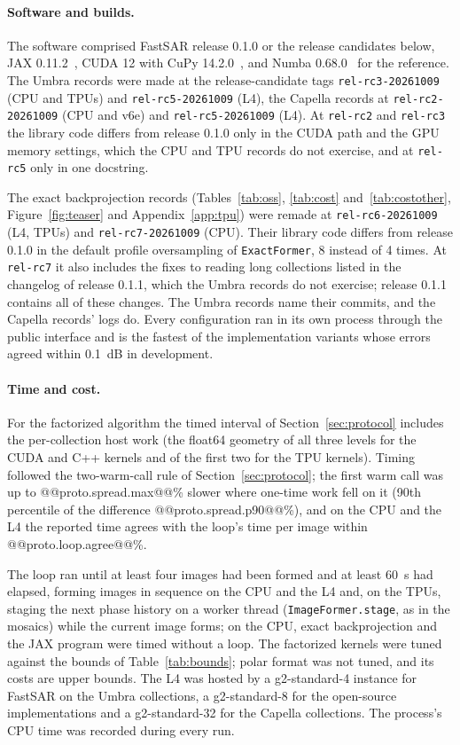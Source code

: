 \documentclass[11pt]{article}
\begin{document}
\paragraph{Software and builds.} The software comprised FastSAR release 0.1.0 or the release candidates below, JAX 0.11.2~\cite{jax2018}, CUDA 12 with CuPy 14.2.0~\cite{okuta2017}, and Numba 0.68.0~\cite{lam2015} for the reference. The Umbra records were made at the release-candidate tags \texttt{rel-rc3-20261009} (CPU and TPUs) and \texttt{rel-rc5-20261009} (L4), the Capella records at \texttt{rel-rc2-20261009} (CPU and v6e) and \texttt{rel-rc5-20261009} (L4). At \texttt{rel-rc2} and \texttt{rel-rc3} the library code differs from release 0.1.0 only in the CUDA path and the GPU memory settings, which the CPU and TPU records do not exercise, and at \texttt{rel-rc5} only in one docstring.

The exact backprojection records (Tables~\ref{tab:oss}, \ref{tab:cost} and~\ref{tab:costother}, Figure~\ref{fig:teaser} and Appendix~\ref{app:tpu}) were remade at \texttt{rel-rc6-20261009} (L4, TPUs) and \texttt{rel-rc7-20261009} (CPU). Their library code differs from release 0.1.0 in the default profile oversampling of \texttt{ExactFormer}, 8 instead of 4 times. At \texttt{rel-rc7} it also includes the fixes to reading long collections listed in the changelog of release 0.1.1, which the Umbra records do not exercise; release 0.1.1 contains all of these changes. The Umbra records name their commits, and the Capella records' logs do. Every configuration ran in its own process through the public interface and is the fastest of the implementation variants whose errors agreed within 0.1~dB in development.

\paragraph{Time and cost.} For the factorized algorithm the timed interval of Section~\ref{sec:protocol} includes the per-collection host work (the float64 geometry of all three levels for the CUDA and C++ kernels and of the first two for the TPU kernels). Timing followed the two-warm-call rule of Section~\ref{sec:protocol}; the first warm call was up to @@proto.spread.max@@\% slower where one-time work fell on it (90th percentile of the difference @@proto.spread.p90@@\%), and on the CPU and the L4 the reported time agrees with the loop's time per image within @@proto.loop.agree@@\%.

The loop ran until at least four images had been formed and at least 60~s had elapsed, forming images in sequence on the CPU and the L4 and, on the TPUs, staging the next phase history on a worker thread (\texttt{ImageFormer.stage}, as in the mosaics) while the current image forms; on the CPU, exact backprojection and the JAX program were timed without a loop. The factorized kernels were tuned against the bounds of Table~\ref{tab:bounds}; polar format was not tuned, and its costs are upper bounds. The L4 was hosted by a g2-standard-4 instance for FastSAR on the Umbra collections, a g2-standard-8 for the open-source implementations and a g2-standard-32 for the Capella collections. The process's CPU time was recorded during every run.
\end{document}
